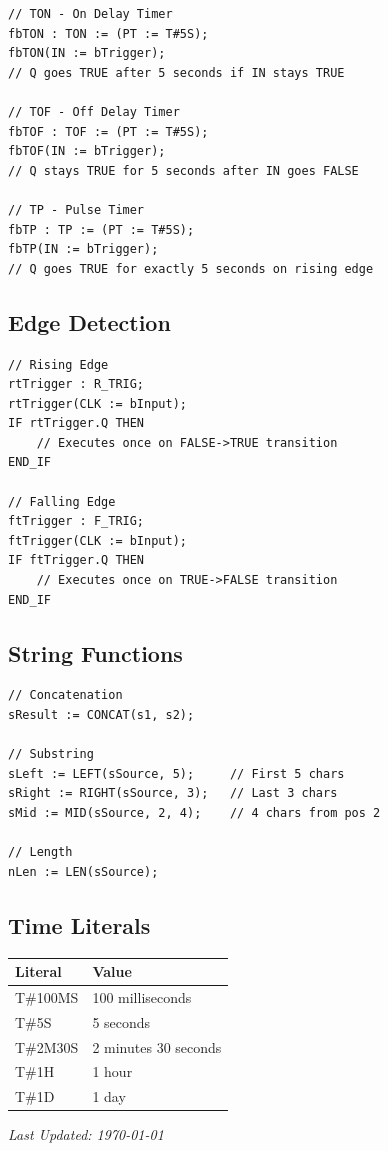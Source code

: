 \documentclass[11pt,a4paper]{article}
\begin{document}
\begin{lstlisting}
// TON - On Delay Timer
fbTON : TON := (PT := T#5S);
fbTON(IN := bTrigger);
// Q goes TRUE after 5 seconds if IN stays TRUE

// TOF - Off Delay Timer
fbTOF : TOF := (PT := T#5S);
fbTOF(IN := bTrigger);
// Q stays TRUE for 5 seconds after IN goes FALSE

// TP - Pulse Timer
fbTP : TP := (PT := T#5S);
fbTP(IN := bTrigger);
// Q goes TRUE for exactly 5 seconds on rising edge
\end{lstlisting}

\subsection*{Edge Detection}

\begin{lstlisting}
// Rising Edge
rtTrigger : R_TRIG;
rtTrigger(CLK := bInput);
IF rtTrigger.Q THEN
    // Executes once on FALSE->TRUE transition
END_IF

// Falling Edge
ftTrigger : F_TRIG;
ftTrigger(CLK := bInput);
IF ftTrigger.Q THEN
    // Executes once on TRUE->FALSE transition
END_IF
\end{lstlisting}

\subsection*{String Functions}

\begin{lstlisting}
// Concatenation
sResult := CONCAT(s1, s2);

// Substring
sLeft := LEFT(sSource, 5);     // First 5 chars
sRight := RIGHT(sSource, 3);   // Last 3 chars
sMid := MID(sSource, 2, 4);    // 4 chars from pos 2

// Length
nLen := LEN(sSource);
\end{lstlisting}

\subsection*{Time Literals}

\begin{table}[h]
\centering
\begin{tabular}{@{}ll@{}}
\toprule
\textbf{Literal} & \textbf{Value} \\
\midrule
T\#100MS & 100 milliseconds \\
T\#5S & 5 seconds \\
T\#2M30S & 2 minutes 30 seconds \\
T\#1H & 1 hour \\
T\#1D & 1 day \\
\bottomrule
\end{tabular}
\end{table}

\vfill

\begin{center}
\textit{Last Updated: \today}
\end{center}
\end{document}
